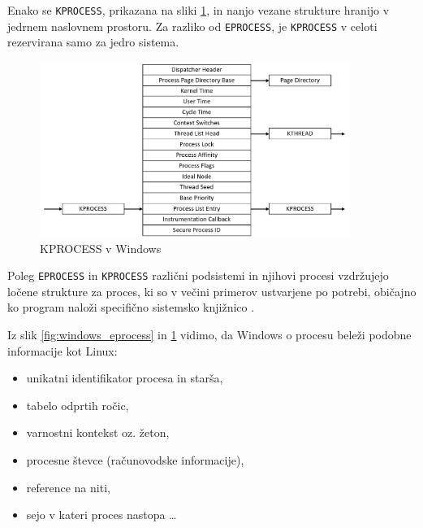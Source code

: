 \documentclass[a4paper,12pt,openright]{book}
\begin{document}
Enako se \texttt{KPROCESS}, prikazana na sliki \ref{fig:windows_kprocess}, in nanjo vezane strukture hranijo v jedrnem naslovnem prostoru.
Za razliko od \texttt{EPROCESS}, je \texttt{KPROCESS} v celoti rezervirana samo za jedro sistema.

\begin{figure}[h!]
	\begin{center}
		\includegraphics[width=0.9\textwidth]{images/windows_kprocess.png}
	\end{center}
	\caption{KPROCESS v Windows \cite{Yosifovich_Russinovich_Solomon_Ionescu_2017}}
	\label{fig:windows_kprocess}
\end{figure}

Poleg \texttt{EPROCESS} in \texttt{KPROCESS} različni podsistemi in njihovi procesi vzdržujejo ločene strukture za proces, ki so v večini primerov ustvarjene po potrebi, običajno ko program naloži specifično sistemsko knjižnico \cite{Yosifovich_Russinovich_Solomon_Ionescu_2017}.

Iz slik \ref{fig:windows_eprocess} in \ref{fig:windows_kprocess} vidimo, da Windows o procesu beleži podobne informacije kot Linux:
\begin{itemize}
	\item unikatni identifikator procesa in starša,
	\item tabelo odprtih ročic,
	\item varnostni kontekst oz. žeton,
	\item procesne števce (računovodske informacije),
	\item reference na niti,
	\item sejo v kateri proces nastopa \dots
\end{itemize}

\end{document}
